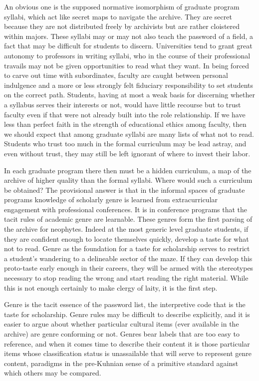 \documentclass[]{book}
\theoremstyle{definition}
\theoremstyle{definition}
\theoremstyle{definition}
\theoremstyle{remark}
\begin{document}
An obvious one is the supposed normative isomorphism of graduate program
syllabi, which act like secret maps to navigate the archive. They are
secret because they are not distributed freely by archivists but are
rather cloistered within majors. These syllabi may or may not also teach
the password of a field, a fact that may be difficult for students to
discern. Universities tend to grant great autonomy to professors in
writing syllabi, who in the course of their professional travails may
not be given opportunities to read what they want. In being forced to
carve out time with subordinates, faculty are caught between personal
indulgence and a more or less strongly felt fiduciary responsibility to
set students on the correct path. Students, having at most a weak basis
for discerning whether a syllabus serves their interests or not, would
have little recourse but to trust faculty even if that were not already
built into the role relationship. If we have less than perfect faith in
the strength of educational ethics among faculty, then we should expect
that among graduate syllabi are many lists of what not to read. Students
who trust too much in the formal curriculum may be lead astray, and even
without trust, they may still be left ignorant of where to invest their
labor.

In each graduate program there then must be a hidden curriculum, a map
of the archive of higher quality than the formal syllabi. Where would
such a curriculum be obtained? The provisional answer is that in the
informal spaces of graduate programs knowledge of scholarly genre is
learned from extracurricular engagement with professional conferences.
It is in conference programs that the tacit rules of academic genre are
learnable. These genres form the first parsing of the archive for
neophytes. Indeed at the most generic level graduate students, if they
are confident enough to locate themselves quickly, develop a taste for
what not to read. Genre as the foundation for a taste for scholarship
serves to restrict a student's wandering to a delineable sector of the
maze. If they can develop this proto-taste early enough in their
careers, they will be armed with the stereotypes necessary to stop
reading the wrong and start reading the right material. While this is
not enough certainly to make clergy of laity, it is the first step.

Genre is the tacit essence of the password list, the interpretive code
that is the taste for scholarship. Genre rules may be difficult to
describe explicitly, and it is easier to argue about whether particular
cultural items (ever available in the archive) are genre conforming or
not. Genres bear labels that are too easy to reference, and when it
comes time to describe their content it is those particular items whose
classification status is unassailable that will serve to represent genre
content, paradigms in the pre-Kuhnian sense of a primitive standard
against which others may be compared.
\end{document}
